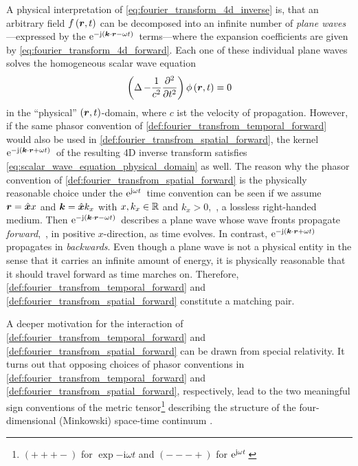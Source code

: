 A physical interpretation of \eqref{eq:fourier_transform_4d_inverse} is,
that an arbitrary field $f \left( \robs, t \right)$ can be decomposed 
into an infinite number of \emph{plane waves}---expressed by the
$\exp{-\im \left( \pvec{k} \cdot \robs - \omega t \right)}$ terms---where
the expansion coefficients are given by \eqref{eq:fourier_transform_4d_forward}.
Each one of these individual plane waves solves
the homogeneous scalar wave equation \cite[32]{Sommerfeld1964}
\begin{equation}\label{eq:scalar_wave_equation_physical_domain}
	\left( \laplace - \frac{1}{c^2} \frac{\partial^2}{\partial t^2} \right)	
	\phi \left( \pvec{r}, t \right) = 0
\end{equation}
in the \enquote{physical} $\left(\pvec{r}, t\right)$-domain, where $c$ ist
the velocity of propagation.
However, if the same phasor convention of
\cref{def:fourier_transfrom_temporal_forward} would also be used in
\cref{def:fourier_transfrom_spatial_forward}, the kernel
$\exp{-\im \left( \pvec{k} \cdot \robs + \omega t \right)}$
of the resulting 4D inverse transform satisfies
\eqref{eq:scalar_wave_equation_physical_domain} as well.
The reason why the phasor convention of
\cref{def:fourier_transfrom_spatial_forward} is the physically reasonable choice
under the $\mathrm{e}^{\mathrm{j} \omega t}\,$ time convention
can be seen if we assume $\pvec{r} = \uv{x} x$ and $\pvec{k} = \uv{x} k_x$
with $x, k_x \in \mathbb{R}$ and $k_x > 0$,~\ie, a lossless right-handed medium.
Then $\exp{-\im \left( \pvec{k} \cdot \robs - \omega t \right)}$ describes
a plane wave whose wave fronts propagate \emph{forward},~\ie, in positive
$x$-direction, as time evolves.
In contrast,
$\exp{-\im \left( \pvec{k} \cdot \robs + \omega t \right)}$
propagates in \emph{backwards}.
Even though a plane wave is not a physical entity in the sense that it carries
an infinite amount of energy, it is physically reasonable that it should
travel forward as time marches on.
Therefore, \cref{def:fourier_transfrom_temporal_forward} and
\cref{def:fourier_transfrom_spatial_forward} constitute a matching pair.

A deeper motivation for the interaction of
\cref{def:fourier_transfrom_temporal_forward} and 
\cref{def:fourier_transfrom_spatial_forward} can be drawn from special
relativity.
It turns out that opposing choices of phasor conventions in
\cref{def:fourier_transfrom_temporal_forward} and
\cref{def:fourier_transfrom_spatial_forward}, respectively, lead to the two
meaningful sign conventions of the metric tensor\footnote{
	$\left( + + + - \right)$ for $\exp{-\mathrm{i} \omega t}$
	and $\left( - - - + \right)$ for $\mathrm{e}^{\mathrm{j} \omega t}\,$}
describing the structure of the four-dimensional (Minkowski) space-time
continuum \cite[p624]{Jackson2013}\cite{Kaiser2016}.







